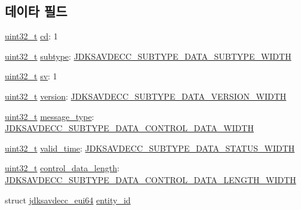\subsection*{데이타 필드}
\begin{DoxyCompactItemize}
\item 
\hyperlink{parse_8c_a6eb1e68cc391dd753bc8ce896dbb8315}{uint32\+\_\+t} \hyperlink{structjdksavdecc__adpdu__common__control__header_a9bdcd90bda4a8763700a1d59c27a6a26}{cd}\+: 1
\item 
\hyperlink{parse_8c_a6eb1e68cc391dd753bc8ce896dbb8315}{uint32\+\_\+t} \hyperlink{structjdksavdecc__adpdu__common__control__header_aed06f4a516930ca81d204d53c61a1ef3}{subtype}\+: \hyperlink{group__jdksavdecc__subtype__data_ga624227fd72dbec4cbec4f6436024fad8}{J\+D\+K\+S\+A\+V\+D\+E\+C\+C\+\_\+\+S\+U\+B\+T\+Y\+P\+E\+\_\+\+D\+A\+T\+A\+\_\+\+S\+U\+B\+T\+Y\+P\+E\+\_\+\+W\+I\+D\+TH}
\item 
\hyperlink{parse_8c_a6eb1e68cc391dd753bc8ce896dbb8315}{uint32\+\_\+t} \hyperlink{structjdksavdecc__adpdu__common__control__header_a9eeedef9f348218323834a3cf44d64c4}{sv}\+: 1
\item 
\hyperlink{parse_8c_a6eb1e68cc391dd753bc8ce896dbb8315}{uint32\+\_\+t} \hyperlink{structjdksavdecc__adpdu__common__control__header_acd99bb05ca015e7d74448acb1deba7ca}{version}\+: \hyperlink{group__jdksavdecc__subtype__data_ga97591e640a971dc293e1416455fb9ee3}{J\+D\+K\+S\+A\+V\+D\+E\+C\+C\+\_\+\+S\+U\+B\+T\+Y\+P\+E\+\_\+\+D\+A\+T\+A\+\_\+\+V\+E\+R\+S\+I\+O\+N\+\_\+\+W\+I\+D\+TH}
\item 
\hyperlink{parse_8c_a6eb1e68cc391dd753bc8ce896dbb8315}{uint32\+\_\+t} \hyperlink{structjdksavdecc__adpdu__common__control__header_a84c56f5f8c75e0b021f73b2882280040}{message\+\_\+type}\+: \hyperlink{group__jdksavdecc__subtype__data_ga032f46118325ac56a0505490dff24963}{J\+D\+K\+S\+A\+V\+D\+E\+C\+C\+\_\+\+S\+U\+B\+T\+Y\+P\+E\+\_\+\+D\+A\+T\+A\+\_\+\+C\+O\+N\+T\+R\+O\+L\+\_\+\+D\+A\+T\+A\+\_\+\+W\+I\+D\+TH}
\item 
\hyperlink{parse_8c_a6eb1e68cc391dd753bc8ce896dbb8315}{uint32\+\_\+t} \hyperlink{structjdksavdecc__adpdu__common__control__header_a936d4fc925e2d4001b93c159b094819b}{valid\+\_\+time}\+: \hyperlink{group__jdksavdecc__subtype__data_ga38a112978fe469b74b7541de23733f50}{J\+D\+K\+S\+A\+V\+D\+E\+C\+C\+\_\+\+S\+U\+B\+T\+Y\+P\+E\+\_\+\+D\+A\+T\+A\+\_\+\+S\+T\+A\+T\+U\+S\+\_\+\+W\+I\+D\+TH}
\item 
\hyperlink{parse_8c_a6eb1e68cc391dd753bc8ce896dbb8315}{uint32\+\_\+t} \hyperlink{structjdksavdecc__adpdu__common__control__header_ae87a102016a7b6abd96bba5df2ae3768}{control\+\_\+data\+\_\+length}\+: \hyperlink{group__jdksavdecc__subtype__data_ga0bd033997c197fad16adfd5e24708935}{J\+D\+K\+S\+A\+V\+D\+E\+C\+C\+\_\+\+S\+U\+B\+T\+Y\+P\+E\+\_\+\+D\+A\+T\+A\+\_\+\+C\+O\+N\+T\+R\+O\+L\+\_\+\+D\+A\+T\+A\+\_\+\+L\+E\+N\+G\+T\+H\+\_\+\+W\+I\+D\+TH}
\item 
struct \hyperlink{structjdksavdecc__eui64}{jdksavdecc\+\_\+eui64} \hyperlink{structjdksavdecc__adpdu__common__control__header_a26ec635a862a0163fe5b1ff90b5f4885}{entity\+\_\+id}
\end{DoxyCompactItemize}



